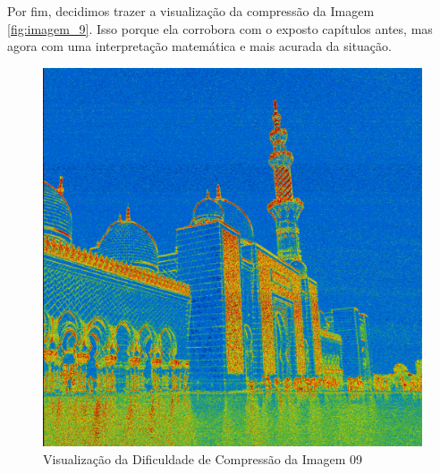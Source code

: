 \newpage
\paragrafo Por fim, decidimos trazer a visualização da compressão da Imagem \ref{fig:imagem_9}. Isso porque ela corrobora com o exposto capítulos antes, mas agora com uma interpretação matemática e mais acurada da situação.


\begin{figure}[h!]
    \centering
    \caption{Visualização da Dificuldade de Compressão da Imagem 09}
    \label{fig:imagem_09}
    
    \includegraphics[scale=0.1]{Documeto/1-ElementosTextuais/1-Desenvolvimento/imagens-atividade3/IMG09T.png}

    
\end{figure}